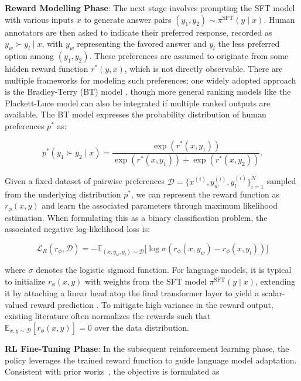 \textbf{Reward Modelling Phase}: The next stage involves prompting the SFT model with various inputs $x$ to generate answer pairs $(y_1, y_2) \sim \pi^\text{SFT}(y \mid x)$. Human annotators are then asked to indicate their preferred response, recorded as $y_w \succ y_l \mid x$, with $y_w$ representing the favored answer and $y_l$ the less preferred option among $(y_1, y_2)$. These preferences are assumed to originate from some hidden reward function $r^*(y, x)$, which is not directly observable. There are multiple frameworks for modeling such preferences; one widely adopted approach is the Bradley-Terry (BT) model \cite{bradley1952rankanalysis}, though more general ranking models like the Plackett-Luce model \citep{plackett1975analysis, luce2012individual} can also be integrated if multiple ranked outputs are available. The BT model expresses the probability distribution of human preferences $p^*$ as:

\begin{equation}\label{eq:bradley-terry}
    p^*(y_1\succ y_2 \mid x)=\frac{\exp\left(r^*(x, y_1)\right)}{\exp\left(r^*(x, y_1)\right) + \exp\left(r^*(x, y_2)\right)}.
\end{equation}

Given a fixed dataset of pairwise preferences $\mathcal{D}=\bigl\{x^{(i)}, y_w^{(i)}, y_l^{(i)}\bigr\}_{i=1}^N$ sampled from the underlying distribution $p^*$, we can represent the reward function as $r_{\phi}(x, y)$ and learn the associated parameters through maximum likelihood estimation. When formulating this as a binary classification problem, the associated negative log-likelihood loss is:

\begin{equation}\label{eq:reward_model}
    \mathcal{L}_R(r_{\phi}, \mathcal{D}) = -\mathbb{E}_{(x, y_w, y_l)\sim \mathcal{D}}\bigl[\log \sigma(r_{\phi}(x, y_w)- r_{\phi}(x, y_l))\bigr]
\end{equation}

where $\sigma$ denotes the logistic sigmoid function. For language models, it is typical to initialize $r_{\phi}(x, y)$ with weights from the SFT model $\pi^\text{SFT}(y \mid x)$, extending it by attaching a linear head atop the final transformer layer to yield a scalar-valued reward prediction \cite{ziegler2020finetuning}. To mitigate high variance in the reward output, existing literature often normalizes the rewards such that $\mathbb{E}_{x,y\sim \mathcal{D}}\left[r_\phi(x, y)\right] = 0$ over the data distribution.

\textbf{RL Fine-Tuning Phase}: In the subsequent reinforcement learning phase, the policy leverages the trained reward function to guide language model adaptation. Consistent with prior works~\citep{jaques2017sequence, jaques2020human}, the objective is formulated as

